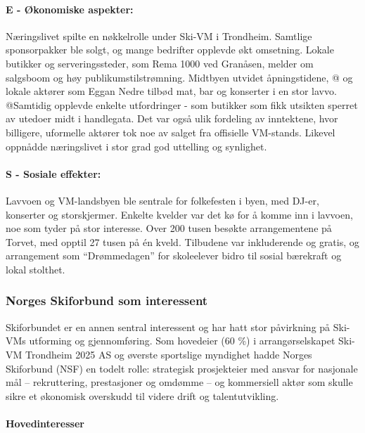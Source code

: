 \paragraph{E - Økonomiske aspekter:}
Næringslivet spilte en nøkkelrolle under Ski-VM i Trondheim. Samtlige sponsorpakker ble solgt, og 
mange bedrifter opplevde økt omsetning. Lokale butikker og serveringssteder, som Rema 1000 
ved Granåsen, melder om salgsboom og høy publikumstilstrømning. Midtbyen utvidet åpningstidene, @
og lokale aktører som Eggan Nedre tilbød mat, bar og konserter i en stor lavvo. 
@Samtidig opplevde enkelte utfordringer - som butikker som fikk utsikten sperret av 
utedoer midt i handlegata. Det var også ulik fordeling av inntektene, hvor billigere, 
uformelle aktører tok noe av salget fra offisielle VM-stands. Likevel oppnådde næringslivet i 
stor grad god uttelling og synlighet.

\paragraph{S - Sosiale effekter:}
Lavvoen og VM-landsbyen ble sentrale for folkefesten i byen, med DJ-er, konserter og 
storskjermer. Enkelte kvelder var det kø for å komme inn i lavvoen, noe som tyder på stor 
interesse. Over 200 tusen besøkte arrangementene på Torvet, med opptil 27 tusen på én kveld. 
Tilbudene var inkluderende og gratis, og arrangement som “Drømmedagen” for skoleelever bidro til 
sosial bærekraft og lokal stolthet.



\subsubsection{Norges Skiforbund som interessent}
Skiforbundet er en annen sentral interessent og har hatt stor påvirkning på Ski-VMs utforming 
og gjennomføring. Som hovedeier (60 \%) i arrangørselskapet Ski-VM Trondheim 2025 AS og øverste 
sportslige myndighet hadde Norges Skiforbund (NSF) en todelt rolle: strategisk prosjekteier med 
ansvar for nasjonale mål -- rekruttering, prestasjoner og omdømme -- og kommersiell aktør som 
skulle sikre et økonomisk overskudd til videre drift og talentutvikling\cite{ProffSkiVM2025}.

\paragraph{Hovedinteresser}

